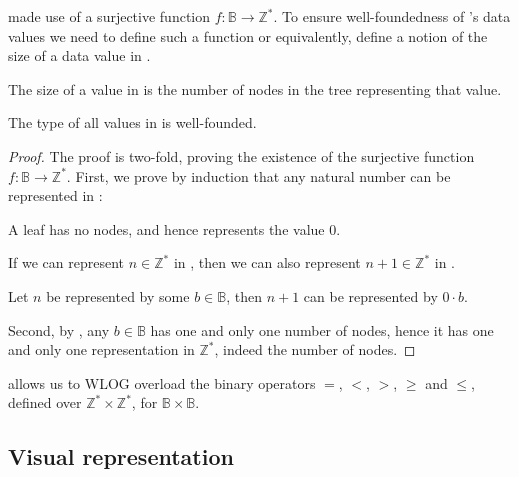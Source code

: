  made use of a surjective function $f :
\mathbb{B}\rightarrow\mathbb{Z}^*$. To ensure well-foundedness of \D{}'s data
values we need to define such a function or equivalently, define a notion of
the size of a data value in \D{}.

\begin{definition}\label{definition:size} The size of a value in \D{} is the
number of nodes in the tree representing that value.\end{definition}

\begin{theorem}\label{theorem:type-is-well-founded} The type of all values in
\D{} is well-founded.\end{theorem}

\begin{proof} The proof is two-fold, proving the existence of the surjective
function $f:\mathbb{B}\rightarrow\mathbb{Z}^*$. First, we prove by induction that
any natural number can be represented in \D{}:

\begin{description}[\setleftmargin{70pt}\setlabelstyle{\bf}]

\item [Base case] A leaf has no nodes, and hence represents the value $0$.

\item [Assumption] If we can represent $n\in\mathbb{Z}^*$ in \D{}, then we can
also represent $n+1\in\mathbb{Z}^*$ in \D{}. 

\item [Induction] Let $n$ be represented by some $b\in\mathbb{B}$, then $n+1$
can be represented by $0\cdot b$. 

\end{description}

Second, by , any $b\in\mathbb{B}$ has one and only
one number of nodes, hence it has one and only one representation in
$\mathbb{Z}^*$, indeed the number of nodes.\end{proof}

\begin{definition}  allows us to WLOG overload the
binary operators $=$, $<$, $>$, $\geq$ and $\leq$, defined over
$\mathbb{Z}^*\times\mathbb{Z}^*$, for
$\mathbb{B}\times\mathbb{B}$.\end{definition}

\subsection{Visual representation}

